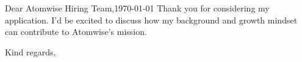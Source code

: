\documentclass[12pt]{HHUletter}
\begin{document}
\begin{letter}{Dear Atomwise Hiring Team,\hfill\today}
        Thank you for considering my application. I'd be excited to discuss how my background and growth mindset can contribute to Atomwise's mission.

		\closing{Kind regards,}
		
		
		
		
	\end{letter}
	
\end{document}
